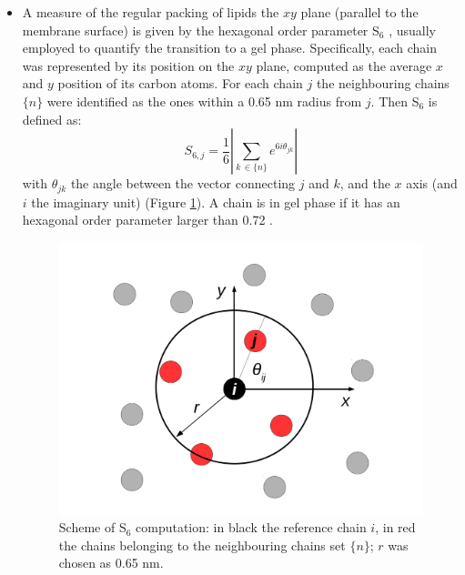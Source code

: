 \begin{itemize}
\item A measure of the regular packing of lipids the $xy$ plane (parallel to the membrane surface) is given by the hexagonal order parameter S$_6$ \citep{Uppulury2015}, usually employed to quantify the transition to a gel phase. Specifically, each chain was represented by its position on the $xy$ plane, computed as the average $x$ and $y$ position of its carbon atoms.
%
For each chain $j$ the neighbouring chains $\{n\}$ were identified as the ones within a 0.65 nm radius from $j$. Then S$_6$ is defined as:
\begin{equation}
S_{6,j} = \frac{1}{6} \left| \sum_{k \,\in \{n\}} e^{6i\theta_{jk}} \right|
\end{equation}
with $\theta_{jk}$ the angle between the vector connecting $j$ and $k$, and the $x$ axis (and $i$ the imaginary unit) (Figure \ref{fig:S6_theory}). A chain is in gel phase if it has an hexagonal order parameter larger than 0.72 \citep{Uppulury2015}.
\begin{figure}[h!]
\centering
\includegraphics[width=0.55\linewidth]{3results_capsule/pics/s6_theory.pdf}
\caption[Scheme of S$_6$ computation]{Scheme of S$_6$ computation: in black the reference chain $i$, in red the chains belonging to the neighbouring chains set $\{n\}$; $r$ was chosen as 0.65 nm.} \label{fig:S6_theory}
\end{figure}


\end{itemize}
